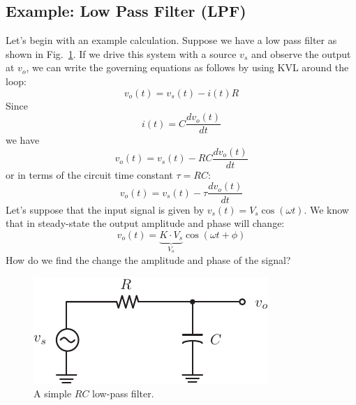 \subsection{Example:  Low Pass Filter (LPF)}
Let's begin with an example calculation.  Suppose we have a low pass filter as shown in Fig.~\ref{fig:lpf}.  If we drive this system with a source $v_s$ and observe the output at $v_o$, we can write the governing equations as follows by using KVL around the loop:
    \begin{equation}
        v_o(t) = v_s(t) - i(t) R
    \end{equation}
    Since
    \begin{equation}
        i(t) = C \frac{dv_o(t)}{dt}
    \end{equation}
    we have
    \begin{equation}
        v_o(t) = v_s(t) - RC \frac{dv_o(t)}{dt}
    \end{equation}
    or in terms of the circuit time constant $\tau = RC$:
    \begin{equation}
        v_o(t) = v_s(t) - \tau \frac{dv_o(t)}{dt}
    \end{equation}
Let's suppose that the input signal is given by $v_s(t) = V_s \cos(\omega t)$.  We know that in steady-state  the output amplitude and phase will change: 
    \begin{equation}
        v_o(t) = \underbrace{K \cdot V_s}_{V_o} \cos(\omega t + \phi) \label{eq:kvl1}
    \end{equation}  
How do we find the change the amplitude and phase of the signal?
\begin{figure}[tb]
\begin{center}
\includegraphics[scale=1]{lpf}
\end{center}
\caption{A simple $RC$ low-pass filter. }
\label{fig:lpf}
\end{figure}
